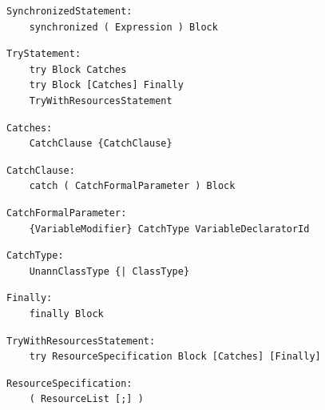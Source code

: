 \noindent\textbf{\texttt{}}\par
\begin{lstlisting}
SynchronizedStatement:
    synchronized ( Expression ) Block
\end{lstlisting}

\noindent\textbf{\texttt{}}\par
\begin{lstlisting}
TryStatement:
    try Block Catches
    try Block [Catches] Finally
    TryWithResourcesStatement
\end{lstlisting}

\noindent\textbf{\texttt{}}\par
\begin{lstlisting}
Catches:
    CatchClause {CatchClause}
\end{lstlisting}

\noindent\textbf{\texttt{}}\par
\begin{lstlisting}
CatchClause:
    catch ( CatchFormalParameter ) Block
\end{lstlisting}

\noindent\textbf{\texttt{}}\par
\begin{lstlisting}
CatchFormalParameter:
    {VariableModifier} CatchType VariableDeclaratorId
\end{lstlisting}

\noindent\textbf{\texttt{}}\par
\begin{lstlisting}
CatchType:
    UnannClassType {| ClassType}
\end{lstlisting}

\noindent\textbf{\texttt{}}\par
\begin{lstlisting}
Finally:
    finally Block
\end{lstlisting}

\noindent\textbf{\texttt{}}\par
\begin{lstlisting}
TryWithResourcesStatement:
    try ResourceSpecification Block [Catches] [Finally]
\end{lstlisting}

\noindent\textbf{\texttt{}}\par
\begin{lstlisting}
ResourceSpecification:
    ( ResourceList [;] )
\end{lstlisting}

